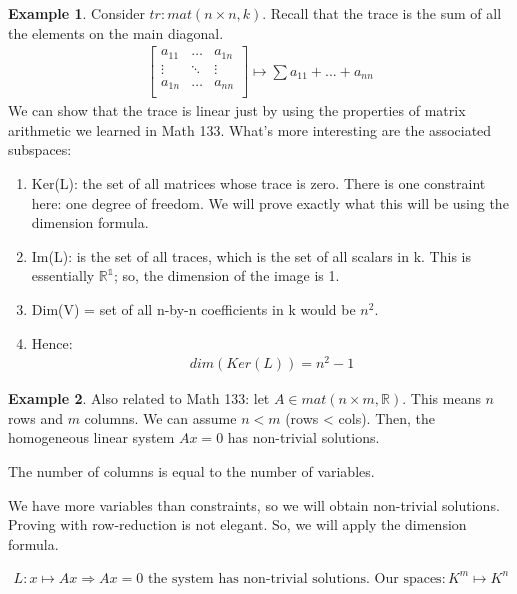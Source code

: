 \documentclass[a4paper, 12pt]{article}
\theoremstyle{definition}
\newtheorem{exmp}{Example}[section]
\theoremstyle{definition}
\theoremstyle{definition}
\theoremstyle{definition}
\newenvironment{itemize_tight}{
	\begin{itemize}
		\setlength{\itemsep}{0pt}
		\setlength{\parskip}{0pt}
	}{\end{itemize}}
\begin{document}
{\begin{exmp}
	Consider $tr: mat(n \times n, k)$. Recall that the trace is the sum of all the elements on the main diagonal. 
	\begin{align*}
		\begin{bmatrix}
			a_{11} &  \hdots & a_{1n} \\ 
			\vdots & \ddots  & \vdots \\
			a_{1n} & \hdots & a_{nn} \\
		\end{bmatrix} \mapsto \sum a_{11} + ... + a_{nn} 
	\end{align*}
	We can show that the trace is linear just by using the properties of matrix arithmetic we learned in Math 133. What's more interesting are the associated subspaces: 
	\begin{enumerate}
		\item Ker(L): the set of all matrices whose trace is zero. There is one constraint here: one degree of freedom. We will prove exactly what this will be using the dimension formula. 
		\item Im(L): is the set of all traces, which is the set of all scalars in k. This is essentially $\mathbb{R^1}$; so, the dimension of the image is 1. 
		\item Dim(V) = set of all n-by-n coefficients in k would be $n^2$. 
		\item Hence:
		\begin{align*}
			dim(Ker(L)) = n^2 -1
		\end{align*}
	\end{enumerate}
\end{exmp}
\begin{exmp}
	Also related to Math 133: let $A \in mat(n \times m, \mathbb{R})$. This means $n$ rows and $m$ columns. We can assume $n < m$ (rows < cols). Then, the homogeneous linear system $Ax =0$ has non-trivial solutions. 
	\begin{itemize_tight}
		\item The number of columns is equal to the number of variables. 
		\item We have more variables than constraints, so we will obtain non-trivial solutions. Proving with row-reduction is not elegant. So, we will apply the dimension formula. 
	\end{itemize_tight}
	\begin{align*}
		L: x \mapsto Ax \Rightarrow Ax = 0 \mbox{ the system has non-trivial solutions. Our spaces}: K^m \mapsto K^n
	\end{align*}

\end{exmp}}
\end{document}
